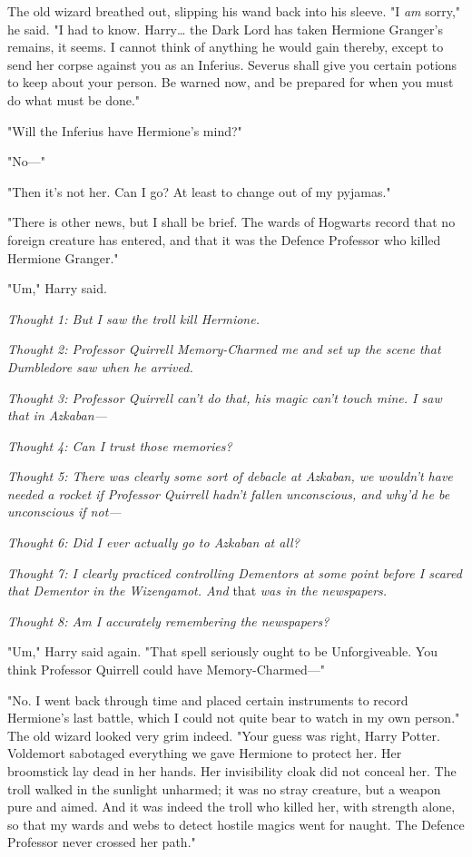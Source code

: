 The old wizard breathed out, slipping his wand back into his sleeve. "I
\emph{am} sorry," he said. "I had to know. Harry{\ldots} the Dark Lord has
taken Hermione Granger's remains, it seems. I cannot think of anything he would
gain thereby, except to send her corpse against you as an Inferius. Severus
shall give you certain potions to keep about your person. Be warned now, and be
prepared for when you must do what must be done."

"Will the Inferius have Hermione's mind?"

"No---"

"Then it's not her. Can I go? At least to change out of my pyjamas."

"There is other news, but I shall be brief. The wards of Hogwarts record that
no foreign creature has entered, and that it was the Defence Professor who
killed Hermione Granger."

"Um," Harry said.

\emph{Thought 1: But I saw the troll kill Hermione.}

\emph{Thought 2: Professor Quirrell Memory-Charmed me and set up the scene that
Dumbledore saw when he arrived.}

\emph{Thought 3: Professor Quirrell can't do that, his magic can't touch mine.
I saw that in Azkaban---}

\emph{Thought 4: Can I trust those memories?}

\emph{Thought 5: There was clearly some sort of debacle at Azkaban, we wouldn't
have needed a rocket if Professor Quirrell hadn't fallen unconscious, and why'd
he be unconscious if not---}

\emph{Thought 6: Did I ever actually go to Azkaban at all?}

\emph{Thought 7: I clearly practiced controlling Dementors at some point before
I scared that Dementor in the Wizengamot. And} that \emph{was in the
newspapers.}

\emph{Thought 8: Am I accurately remembering the newspapers?}

"Um," Harry said again. "That spell seriously ought to be Unforgiveable. You
think Professor Quirrell could have Memory-Charmed---"

"No. I went back through time and placed certain instruments to record
Hermione's last battle, which I could not quite bear to watch in my own
person." The old wizard looked very grim indeed. "Your guess was right, Harry
Potter. Voldemort sabotaged everything we gave Hermione to protect her. Her
broomstick lay dead in her hands. Her invisibility cloak did not conceal her.
The troll walked in the sunlight unharmed; it was no stray creature, but a
weapon pure and aimed. And it was indeed the troll who killed her, with
strength alone, so that my wards and webs to detect hostile magics went for
naught. The Defence Professor never crossed her path."

